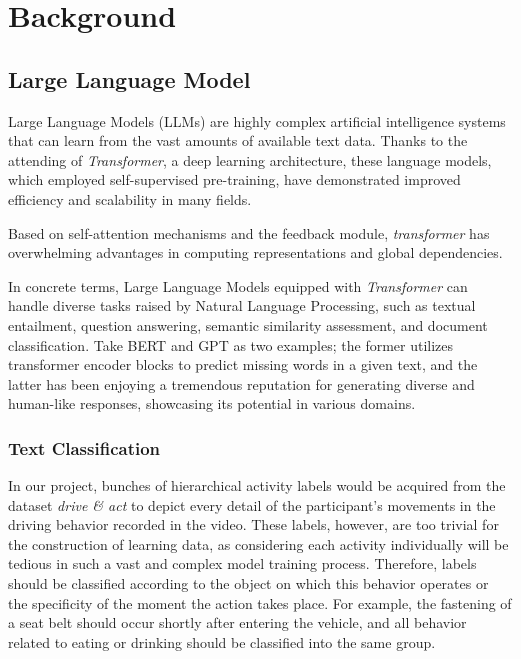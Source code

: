 

\chapter{Background}\label{chapter:background}


\section{Large Language Model}


Large Language Models (LLMs) are highly complex artificial intelligence systems that can learn from the vast amounts of available text data\cite{radford2018improving}. Thanks to the attending of \textit{Transformer}\cite{vaswani2017attention}, a deep learning architecture, these language models, which employed self-supervised pre-training, have demonstrated improved efficiency and scalability in many fields.

Based on self-attention mechanisms and the feedback module, \textit{ transformer} has overwhelming advantages in computing representations and global dependencies.

In concrete terms, Large Language Models equipped with \textit{Transformer} can handle diverse tasks raised by Natural Language Processing\cite{chowdhary2020natural}, such as textual entailment, question answering, semantic similarity assessment, and document classification. Take BERT\cite{alaparthi2020bidirectional} and GPT\cite{radford2018improving,radford2019language,brown2020language} as two examples; the former utilizes transformer encoder blocks to predict missing words in a given text, and the latter has been enjoying a tremendous reputation for generating diverse and human-like responses, showcasing its potential in various domains.

    \subsection{Text Classification}
In our project, bunches of hierarchical activity labels would be acquired from the dataset \textit{drive \& act} to depict every detail of the participant's movements in the driving behavior recorded in the video. These labels, however, are too trivial for the construction of learning data, as considering each activity individually will be tedious in such a vast and complex model training process. Therefore, labels should be classified according to the object on which this behavior operates or the specificity of the moment the action takes place. For example, the fastening of a seat belt should occur shortly after entering the vehicle, and all behavior related to eating or drinking should be classified into the same group.


